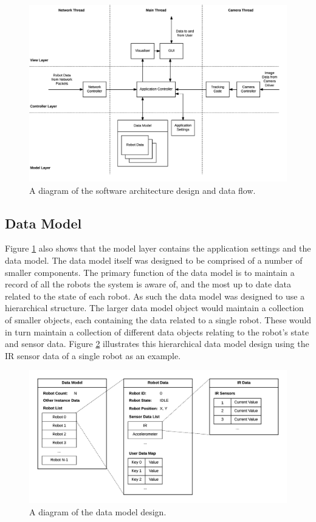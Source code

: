 \begin{figure}
	\centering
	\includegraphics[scale=0.7]{Figures/SoftwareArchitecture.png}
	\decoRule
	\caption[Software Architecture Diagram]{A diagram of the software architecture design and data flow.}
	\label{fig:SoftwareArchitecture}
\end{figure}

\subsection{Data Model}
Figure \ref{fig:SoftwareArchitecture} also shows that the model layer contains the application settings and the data model. The data model itself was designed to be comprised of a number of smaller components. The primary function of the data model is to maintain a record of all the robots the system is aware of, and the most up to date data related to the state of each robot. As such the data model was designed to use a hierarchical structure. The larger data model object would maintain a collection of smaller objects, each containing the data related to a single robot. These would in turn maintain a collection of different data objects relating to the robot's state and sensor data. Figure \ref{fig:DataModel} illustrates this hierarchical data model design using the IR sensor data of a single robot as an example.

\begin{figure}
	\centering
	\includegraphics[scale=0.7]{Figures/DataModel.png}
	\decoRule
	\caption[Data Model Diagram]{A diagram of the data model design.}
	\label{fig:DataModel}
\end{figure}

